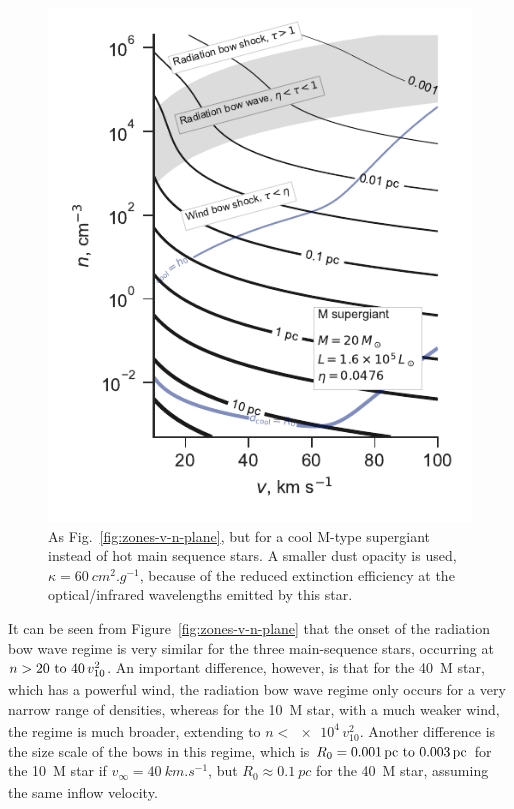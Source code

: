 \message{ !name(dusty-bow-wave.tex)}\documentclass[useAMS, usenatbib, a4paper]{mnras}
\begin{document}
\begin{figure}
  \includegraphics[width=\linewidth]{figs/zones-v-n-plane-RSG}
  \caption{As Fig.~\ref{fig:zones-v-n-plane}, but for a cool M-type
    supergiant instead of hot main sequence stars.  A smaller dust
    opacity is used, \(\kappa = \SI{60}{cm^2.g^{-1}}\), because of the
    reduced extinction efficiency at the optical/infrared wavelengths
    emitted by this star.}
  \label{fig:M-supergiant}
\end{figure}

It can be seen from Figure~\ref{fig:zones-v-n-plane} that the onset of
the radiation bow wave regime is very similar for the three
main-sequence stars, occurring at
\(n > \text{\numrange{20}{40}} \, v_{10}^2\).  An important
difference, however, is that for the \SI{40}{M_\odot} star, which has a
powerful wind, the radiation bow wave regime only occurs for a very
narrow range of densities, whereas for the \SI{10}{M_\odot} star, with a
much weaker wind, the regime is much broader, extending to
\(n < \num{e4} \, v_{10}^2\).  Another difference is the size scale of
the bows in this regime, which is
\(R_0 = \text{\SIrange{0.001}{0.003}{pc}}\) for the \SI{10}{M_\odot} star
if \(v_\infty = \SI{40}{km.s^{-1}}\), but \(R_0 \approx \SI{0.1}{pc}\) for the
\SI{40}{M_\odot} star, assuming the same inflow velocity.
\end{document}

